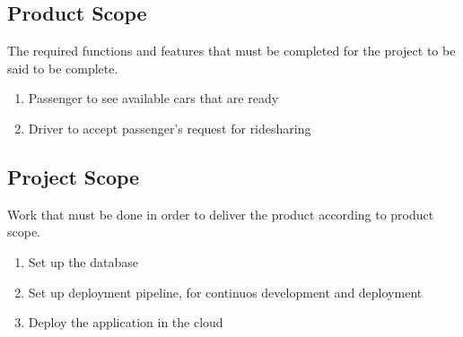 

\subsection{Product Scope}

The required functions and features that must be completed for the project to be said to be complete.

\begin{enumerate}
    \item Passenger to see available cars that are ready
    \item Driver to accept passenger's request for ridesharing
\end{enumerate}

\subsection{Project Scope}

Work that must be done in order to deliver the product according to product scope.

\begin{enumerate}
    \item Set up the database
    \item Set up deployment pipeline, for continuos development and deployment
    \item Deploy the application in the cloud
\end{enumerate}